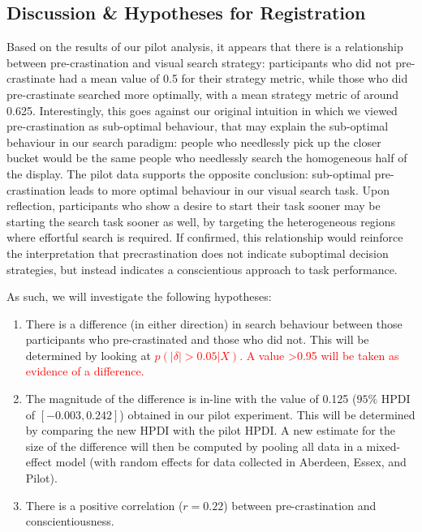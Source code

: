 \documentclass[]{rsos}
\begin{document}
\subsection{Discussion \& Hypotheses for Registration}

Based on the results of our pilot analysis, it appears that there is a relationship between pre-crastination and visual search strategy: participants who did not pre-crastinate had a mean value of 0.5 for their strategy metric, while those who did pre-crastinate searched more optimally, with a mean strategy metric of around 0.625. Interestingly, this goes against our original intuition in which we viewed pre-crastination as sub-optimal behaviour, that may explain the sub-optimal behaviour in our search paradigm: people who needlessly pick up the closer bucket would be the same people who needlessly search the homogeneous half of the display. The pilot data supports the opposite conclusion: sub-optimal pre-crastination leads to more optimal behaviour in our visual search task. Upon reflection, participants who show a desire to start their task sooner may be starting the search task sooner as well, by targeting the heterogeneous regions where effortful search is required. If confirmed, this relationship would reinforce the interpretation that precrastination does not indicate suboptimal decision strategies, but instead indicates a conscientious approach to task performance.

As such, we will investigate the following hypotheses:

\begin{enumerate}
\item There is a difference (in either direction) in search behaviour between those participants who pre-crastinated and those who did not. This will be determined by looking at \textcolor{red}{$p(\lvert \delta \rvert >0.05 | X)$. A value >0.95 will be taken as evidence of a difference.} 
\item The magnitude of the difference is in-line with the value of 0.125 ($95\%$ HPDI of $[-0.003, 0.242]$) obtained in our pilot experiment. This will be determined by comparing the new HPDI with the pilot HPDI. A new estimate for the size of the difference will then be computed by pooling all data in a mixed-effect model (with random effects for data collected in Aberdeen, Essex, and Pilot).
\item There is a positive correlation ($r=0.22$) between pre-crastination and conscientiousness.
\end{enumerate}
\end{document}
